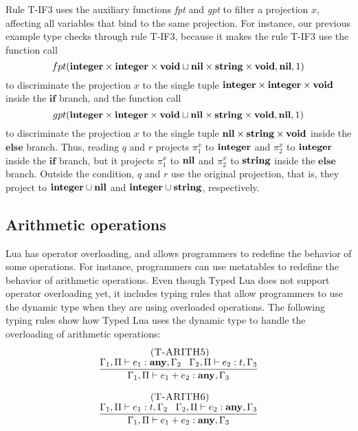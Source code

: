 Rule \textsc{T-IF3} uses the auxiliary functions \emph{fpt} and \emph{gpt}
to filter a projection $x$, affecting all variables that bind to the same projection.
For instance, our previous example type checks through rule \textsc{T-IF3},
because it makes the rule \textsc{T-IF3} use the function call
\[
fpt(\mathbf{integer} \times \mathbf{integer} \times \mathbf{void} \sqcup \mathbf{nil} \times \mathbf{string} \times \mathbf{void}, \mathbf{nil}, 1)
\]
to discriminate the projection $x$ to the single tuple
$\mathbf{integer} \times \mathbf{integer} \times \mathbf{void}$ inside the $\mathbf{if}$ branch,
and the function call
\[
gpt(\mathbf{integer} \times \mathbf{integer} \times \mathbf{void} \sqcup \mathbf{nil} \times \mathbf{string} \times \mathbf{void}, \mathbf{nil}, 1)
\]
to discriminate the projection $x$ to the single tuple
$\mathbf{nil} \times \mathbf{string} \times \mathbf{void}$ inside the $\mathbf{else}$ branch.
Thus, reading $q$ and $r$ projects $\pi_{1}^{x}$ to $\mathbf{integer}$ and
$\pi_{2}^{x}$ to $\mathbf{integer}$ inside the $\mathbf{if}$ branch,
but it projects $\pi_{1}^{x}$ to $\mathbf{nil}$ and $\pi_{2}^{x}$ to $\mathbf{string}$
inside the $\mathbf{else}$ branch.
Outside the condition, $q$ and $r$ use the original projection, that is,
they project to $\mathbf{integer} \cup \mathbf{nil}$ and $\mathbf{integer} \cup \mathbf{string}$, respectively.

\subsection{Arithmetic operations}
\label{sec:arith}

Lua has operator overloading, and allows programmers to redefine
the behavior of some operations.
For instance, programmers can use metatables to redefine the
behavior of arithmetic operations.
Even though Typed Lua does not support operator overloading yet,
it includes typing rules that allow programmers to use the
dynamic type when they are using overloaded operations.
The following typing rules show how Typed Lua uses the dynamic type
to handle the overloading of arithmetic operations:
\[
\begin{array}{c}
\begin{array}{c}
\; (\textsc{T-ARITH5})\\
\dfrac{\Gamma_{1}, \Pi \vdash e_{1}:\mathbf{any}, \Gamma_{2} \;\;\;
       \Gamma_{2}, \Pi \vdash e_{2}:t, \Gamma_{3}}
      {\Gamma_{1}, \Pi \vdash e_{1} + e_{2}:\mathbf{any}, \Gamma_{3}}
\end{array}
\\ \\
\begin{array}{c}
\; (\textsc{T-ARITH6})\\
\dfrac{\Gamma_{1}, \Pi \vdash e_{1}:t, \Gamma_{2} \;\;\;
       \Gamma_{2}, \Pi \vdash e_{2}:\mathbf{any}, \Gamma_{3}}
      {\Gamma_{1}, \Pi \vdash e_{1} + e_{2}:\mathbf{any}, \Gamma_{3}}
\end{array}
\end{array}
\]

